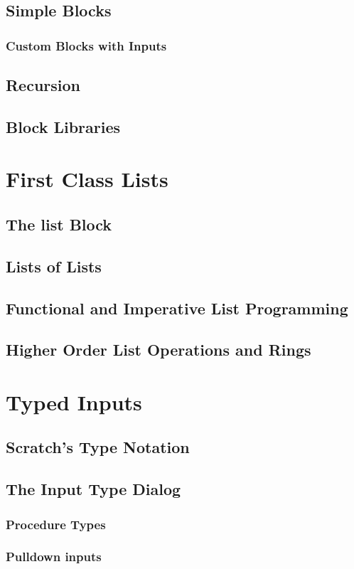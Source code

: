 \documentclass{report}
\begin{document}
\section{Simple Blocks}
\subsection{Custom Blocks with Inputs}
\section{Recursion}
\section{Block Libraries}
\chapter{First Class Lists}
\section{The list Block}
\section{Lists of Lists}
\section{Functional and Imperative List Programming}
\section{Higher Order List Operations and Rings}
\chapter{Typed Inputs}
\section{Scratch's Type Notation}
\section{The \Snap{} Input Type Dialog}
\subsection{Procedure Types}
\subsection{Pulldown inputs}
\end{document}
